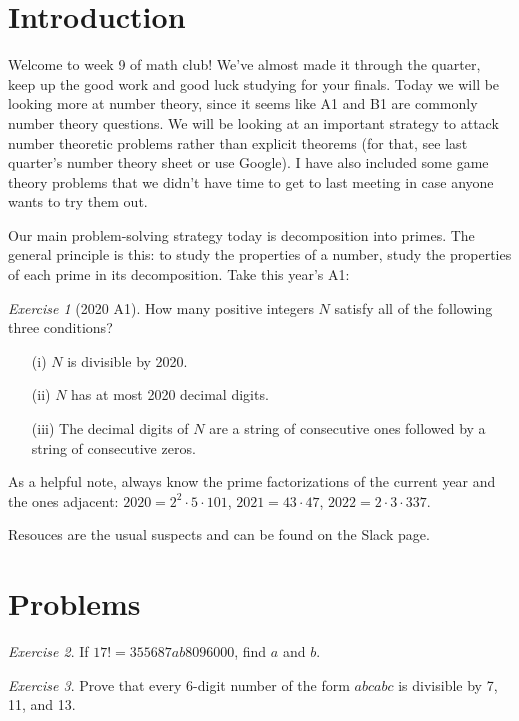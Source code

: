 \documentclass{article}
\theoremstyle{definition}
\theoremstyle{remark}
\newtheorem{exercise}{Exercise}
\begin{document}
\section{Introduction}

    Welcome to week 9 of math club!
    We've almost made it through the quarter, keep up the good work and good luck studying for your finals.
    Today we will be looking more at number theory, since it seems like A1 and B1 are commonly number theory questions.
    We will be looking at an important strategy to attack number theoretic problems rather than explicit theorems (for that, see last quarter's number theory sheet or use Google).
    I have also included some game theory problems that we didn't have time to get to last meeting in case anyone wants to try them out.

    Our main problem-solving strategy today is decomposition into primes.
    The general principle is this: to study the properties of a number, study the properties of each prime in its decomposition.
    Take this year's A1:
    \begin{exercise}[2020 A1]
        How many positive integers \(N\) satisfy all of the following three conditions?
        \begin{enumerate}
            \item[(i)] \(N\) is divisible by 2020.
            \item[(ii)] \(N\) has at most 2020 decimal digits.
            \item[(iii)] The decimal digits of \(N\) are a string of consecutive ones followed by a string of consecutive zeros.
        \end{enumerate}
    \end{exercise}
    As a helpful note, always know the prime factorizations of the current year and the ones adjacent: \(2020=2^2\cdot 5\cdot 101\), \(2021=43\cdot 47\), \(2022=2\cdot 3\cdot 337\).

    Resouces are the usual suspects and can be found on the Slack page.

\section{Problems}

    \begin{exercise}
        If \(17!=355687ab8096000\), find \(a\) and \(b\).
    \end{exercise}

    \begin{exercise}
        Prove that every 6-digit number of the form \(abcabc\) is divisible by 7, 11, and 13.
    \end{exercise}
\end{document}
